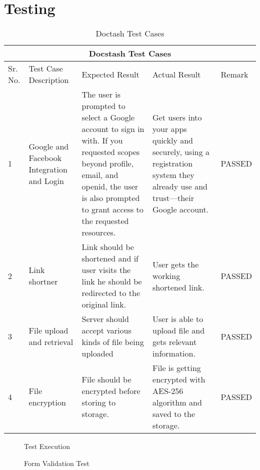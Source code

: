 \chapter{Testing}
\newpage

\begin{table}[h!]
\begin{center}
\begin{tabular}{ |p{1cm}|p{3cm}|p{4cm}|p{4cm}|p{2cm}| }
 \hline
 \multicolumn{5}{|c|}{Docstash Test Cases} \\
 \hline
Sr. No.& Test Case Description &Expected Result &Actual Result &Remark\\
\hline
 1 & Google and Facebook Integration and Login &	The user is prompted to select a Google account to sign in with. If you requested scopes beyond profile, email, and openid, the user is also prompted to grant access to the requested resources. &	Get users into your apps quickly and securely, using a registration system they already use and trust—their Google account. &	PASSED\\
 \hline
 2 & Link shortner  & Link should be shortened and if user visits the link he should be redirected to the original link.&	User gets the working shortened link.&	PASSED\\
 \hline
 3 &File upload and retrieval	& Server should accept various kinds of file being uploaded &	User is able to upload file and gets relevant information.&	PASSED\\
 \hline
 4 & File encryption &File should be encrypted before storing to storage. & File is getting encrypted with AES-256 algorithm and saved to the storage. &	PASSED\\
\hline

\end{tabular}
\caption{Doctash Test Cases}
\end{center}
\end{table}

\newpage

\begin{figure}[h]
\begin{center}
    \caption{Test Execution}
    \label{1}
\end{center}
\end{figure}

\begin{figure}[h]
\begin{center}
    \caption{Form Validation Test}
    \label{1}
\end{center}
\end{figure}

